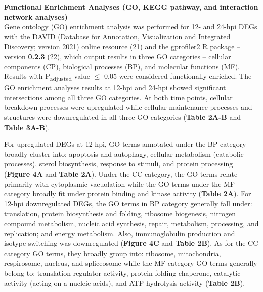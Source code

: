 \documentclass[
]{article}
\begin{document}
\textbf{Functional Enrichment Analyses (GO, KEGG pathway, and
interaction network analyses)}\\
Gene ontology (GO) enrichment analysis was performed for 12- and 24-hpi
DEGs with the DAVID (Database for Annotation, Visualization and
Integrated Discovery; version 2021) online resource (21) and the
gprofiler2 R package -- version \textbf{0.2.3} (22), which output
results in three GO categories -- cellular components (CP), biological
processes (BP), and molecular functions (MF). Results with
P\textsubscript{adjusted}-value \(\leq\) 0.05 were considered
functionally enriched. The GO enrichment analyses results at 12-hpi and
24-hpi showed significant intersections among all three GO categories.
At both time points, cellular breakdown processes were upregulated while
cellular maintenance processes and structures were downregulated in all
three GO categories (\textbf{Table 2A-B} and \textbf{Table 3A-B}).

For upregulated DEGs at 12-hpi, GO terms annotated under the BP category
broadly cluster into: apoptosis and autophagy, cellular metabolism
(catabolic processes), sterol biosynthesis, response to stimuli, and
protein processing (\textbf{Figure 4A} and \textbf{Table 2A}). Under the
CC category, the GO terms relate primarily with cytoplasmic vacuolation
while the GO terms under the MF category broadly fit under protein
binding and kinase activity (\textbf{Table 2A}). For 12-hpi
downregulated DEGs, the GO terms in BP category generally fall under:
translation, protein biosynthesis and folding, ribosome biogenesis,
nitrogen compound metabolism, nucleic acid synthesis, repair,
metabolism, processing, and replication; and energy metabolism. Also,
immunoglobulin production and isotype switching was downregulated
(\textbf{Figure 4C} and \textbf{Table 2B}). As for the CC category GO
terms, they broadly group into: ribosome, mitochondria, respirosome,
nucleus, and spliceosome while the MF category GO terms generally belong
to: translation regulator activity, protein folding chaperone, catalytic
activity (acting on a nucleic acids), and ATP hydrolysis activity
(\textbf{Table 2B}).
\end{document}
